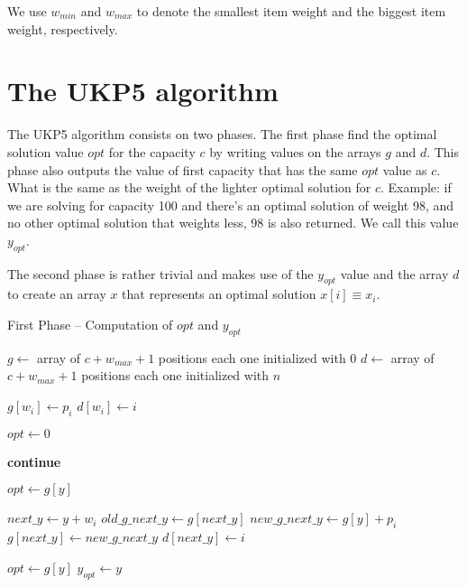 \documentclass[12pt]{article}
\begin{document}
We use \(w_{min}\) and \(w_{max}\) to denote the smallest item weight and the biggest item weight, respectively.

\section{The UKP5 algorithm}

The UKP5 algorithm consists on two phases. The first phase find the optimal solution value \(opt\) for the capacity \(c\) by writing values on the arrays \(g\) and \(d\). This phase also outputs the value of first capacity that has the same \(opt\) value as \(c\). What is the same as the weight of the lighter optimal solution for \(c\). Example: if we are solving for capacity 100 and there's an optimal solution of weight 98, and no other optimal solution that weights less, 98 is also returned. We call this value \(y_{opt}\).

The second phase is rather trivial and makes use of the \(y_{opt}\) value and the array \(d\) to create an array \(x\) that represents an optimal solution \(x[i] \equiv x_i\).

\begin{algorithm}
\caption{First Phase -- Computation of $opt$ and $y_{opt}$}\label{alg:ukp6_write_phase}
\begin{algorithmic}[1]
  \State \(g \gets\) array of \(c + w_{max} + 1\) positions each one initialized with \(0\)\label{create_g}
  \State \(d \gets\) array of \(c + w_{max} + 1\) positions each one initialized with \(n\)\label{create_d}
  
  \label{begin_trivial_bounds}
      \State \(g[w_i] \gets p_i\)
      \State \(d[w_i] \gets i\)
    \EndIf
  \EndFor\label{end_trivial_bounds}

  \State \(opt \gets 0\)\label{init_opt}

  \label{main_ext_loop_begin}
    \label{if_less_than_opt_begin}
    	\State \textbf{continue}
    \EndIf\label{if_less_than_opt_end}
    
    \State \(opt \gets g[y]\)\label{update_opt}
    
    \label{main_inner_loop_begin}
      \State \(next\_y \gets y + w_i\)\label{calc_values_begin}
      \State \(old\_g\_next\_y \gets g[next\_y]\)
      \State \(new\_g\_next\_y \gets g[y] + p_i\)\label{calc_values_end}
      \label{if_new_lower_bound_begin}
        \State \(g[next\_y] \gets new\_g\_next\_y\)
        \State \(d[next\_y] \gets i\)
      \EndIf\label{if_new_lower_bound_end}
    \EndFor\label{main_inner_loop_end}
  \EndFor\label{main_ext_loop_end}

  \label{get_y_opt_loop_begin}
    \label{last_loop_inner_if}
      \State \(opt \gets g[y]\)
      \State \(y_{opt} \gets y\)
    \EndIf
  \EndFor\label{get_y_opt_loop_end}
\EndProcedure
\end{algorithmic}
\end{algorithm}
\end{document}

